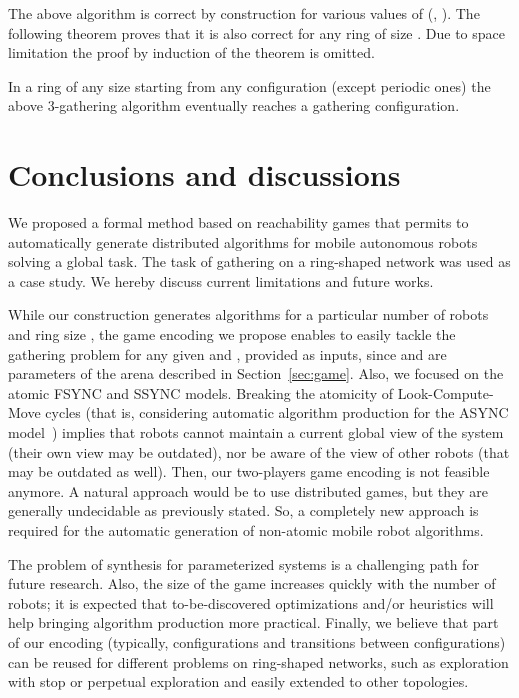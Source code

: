 \documentclass[envcountsame]{llncs} \usepackage[english]{babel}
\begin{document}
The above algorithm is correct by construction for various values of  (, ). 
The following theorem proves that  it is also correct for any ring of size . Due to space limitation the proof by induction of the theorem is omitted. 
\begin{theorem}
In a ring of any size  starting from any configuration (except periodic ones) the above 3-gathering algorithm eventually reaches a gathering configuration. 
\end{theorem}

\section{Conclusions and discussions}

We proposed a formal method based on reachability games that permits to automatically generate distributed algorithms for mobile autonomous robots solving a global task. The task of gathering on a ring-shaped network was used as a case study. We hereby discuss current limitations and future works.

While our construction generates algorithms for a particular number of robots  and ring size , the game encoding we propose enables to easily tackle the gathering problem for any given  and , provided as inputs, since  and  are parameters of the arena described in Section~\ref{sec:game}. Also, we focused on the atomic FSYNC and SSYNC models. Breaking the atomicity of Look-Compute-Move cycles (that is, considering automatic algorithm production for the ASYNC model~\cite{FPS12b}) implies that robots cannot maintain a current global view of the system (their own view may be outdated), nor be aware of the view of other robots (that may be outdated as well). Then, our two-players game encoding is not feasible anymore. A natural approach would be to use distributed games, but they are generally undecidable as previously stated. So, a completely new approach is required for the automatic generation of non-atomic mobile robot algorithms.
 
The problem of synthesis for parameterized systems is a challenging path for future research. Also, the size of the game increases quickly with the number of robots; it is expected that to-be-discovered optimizations and/or heuristics will help bringing algorithm production more practical. Finally, we believe that part of our encoding (typically, configurations and transitions between configurations) can be reused for different problems on ring-shaped networks, such as exploration with stop or perpetual exploration and easily extended to other topologies.


 
 
\end{document}
